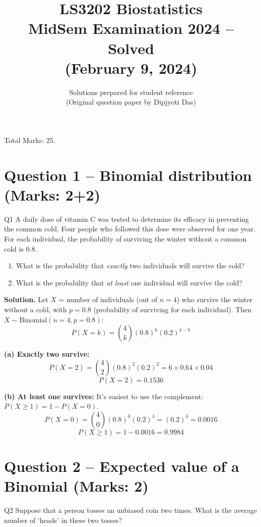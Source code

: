 \documentclass[11pt]{article}
\title{\textbf{LS3202 Biostatistics \\ MidSem Examination 2024 -- Solved} \\ \large (February 9, 2024)}
\author{Solutions prepared for student reference \\ \small (Original question paper by Dipjyoti Das)}
\date{}
\newcommand{\soln}{\par\noindent\textcolor{acolor}{\textbf{Solution.}}\quad}
\begin{document}
\maketitle

\begin{tcolorbox}[colback=notecolor!8, colframe=notecolor, title=Note on this paper]
Total Marks: 25.
\end{tcolorbox}

\tableofcontents
\vspace{1em}

\section{Question 1 -- Binomial distribution (Marks: 2+2)}
\begin{question}{Q1}
A daily dose of vitamin C was tested to determine its efficacy in preventing the common cold. Four people who followed this dose were observed for one year. For each individual, the probability of surviving the winter without a common cold is 0.8.
\begin{enumerate}[label=(\alph*)]
\item What is the probability that \emph{exactly} two individuals will survive the cold?
\item What is the probability that \emph{at least} one individual will survive the cold?
\end{enumerate}
\end{question}

\soln
Let $X$ = number of individuals (out of $n=4$) who survive the winter without a cold, with $p = 0.8$ (probability of surviving for each individual). Then $X \sim \text{Binomial}(n=4, p=0.8)$:
\[
P(X=k) = \binom{4}{k}(0.8)^k(0.2)^{4-k}
\]

\textbf{(a) Exactly two survive:}
\[
P(X=2) = \binom{4}{2}(0.8)^2(0.2)^2 = 6 \times 0.64 \times 0.04
\]
\[
\boxed{P(X=2) = 0.1536}
\]

\textbf{(b) At least one survives:}
It's easiest to use the complement: $P(X \ge 1) = 1 - P(X=0)$.
\[
P(X=0) = \binom{4}{0}(0.8)^0(0.2)^4 = (0.2)^4 = 0.0016
\]
\[
\boxed{P(X \ge 1) = 1 - 0.0016 = 0.9984}
\]

\section{Question 2 -- Expected value of a Binomial (Marks: 2)}
\begin{question}{Q2}
Suppose that a person tosses an unbiased coin two times. What is the average number of `heads' in these two tosses?
\end{question}
\end{document}
